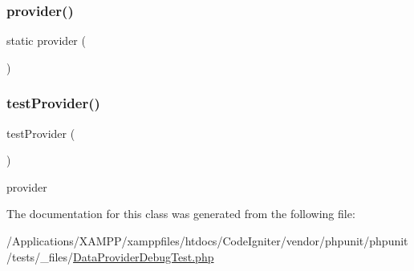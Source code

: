 \subsubsection{\texorpdfstring{provider()}{provider()}}
{\footnotesize\ttfamily static provider (\begin{DoxyParamCaption}{ }\end{DoxyParamCaption})\hspace{0.3cm}{\ttfamily [static]}}

\mbox{\label{class_data_provider_debug_test_ac12be755ed10e7681d5d49644582cc05}} 
\subsubsection{\texorpdfstring{test\+Provider()}{testProvider()}}
{\footnotesize\ttfamily test\+Provider (\begin{DoxyParamCaption}{ }\end{DoxyParamCaption})}

provider 

The documentation for this class was generated from the following file\+:\begin{DoxyCompactItemize}
\item 
/\+Applications/\+X\+A\+M\+P\+P/xamppfiles/htdocs/\+Code\+Igniter/vendor/phpunit/phpunit/tests/\+\_\+files/\mbox{\hyperlink{_data_provider_debug_test_8php}{Data\+Provider\+Debug\+Test.\+php}}\end{DoxyCompactItemize}
